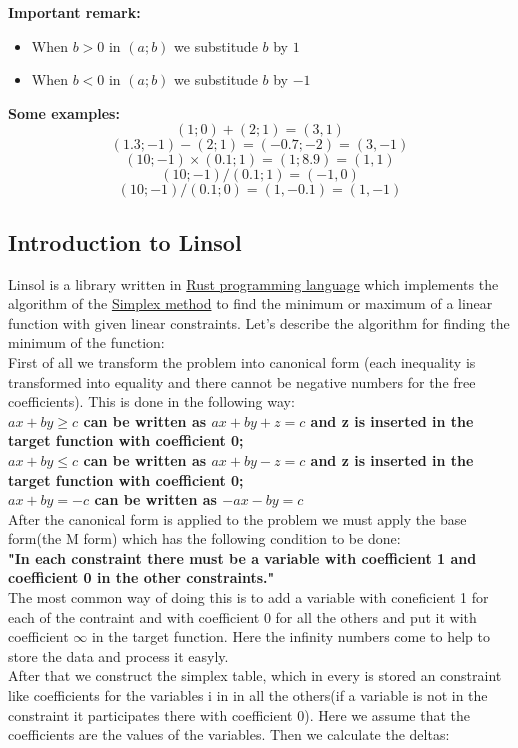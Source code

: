 \documentclass[]{article}
\begin{document}
			\Large{\textbf{Important remark: }}
			\begin{itemize}
				\item When $b>0$ in $(a; b)$ we substitude $b$ by $1$
				\item When $b<0$ in $(a; b)$ we substitude $b$ by $-1$
			\end{itemize}
			\textbf{Some examples:}
			$$(1; 0) + (2; 1) = (3, 1)$$
			$$(1.3; -1) - (2; 1) = (-0.7; -2) = (3, -1)$$
			$$(10; -1) \times (0.1; 1) = (1; 8.9) = (1, 1)$$
			$$(10; -1) / (0.1; 1) = (-1, 0)$$
			$$(10; -1) / (0.1; 0) = (1, -0.1) = (1, -1)$$
		\subsection{Introduction to Linsol}
			Linsol is a library written in  \href{https://www.rust-lang.org/en-US/}{Rust programming language} which implements the algorithm of the \href{https://en.wikipedia.org/wiki/Simplex_algorithm}{Simplex method} to find the minimum or maximum of a linear function with given linear constraints.
			Let's describe the algorithm for finding the minimum of the function:\\
			First of all we transform the problem into canonical form (each inequality is transformed into equality and there cannot be negative numbers for the free coefficients). This is done in the following way:\\
			\textbf{$ ax + by \geq c$ can be written as $ax + by + z = c$ and z is inserted in the target function with coefficient 0;\\
			$ ax + by \leq c$ can be written as $ax + by - z = c$ and z is inserted in the target function with coefficient 0;\\
			$ ax + by = -c$ can be written as $-ax - by = c$}\\
			After the canonical form is applied to the problem we must apply the base form(the M form) which has the following condition to be done:\\
			\textbf{"In each constraint there must be a variable with coefficient 1 and coefficient 0 in the other constraints."}\\
			The most common way of doing this is to add a variable with coneficient 1 for each of the contraint and with coefficient 0 for all the others and put it with coefficient $\infty$ in the target function. Here the infinity numbers come to help to store the data and process it easyly.\\
			After that we construct the simplex table, which in every is stored an constraint like coefficients for the variables i in in all the others(if a variable is not in the constraint it participates there with coefficient 0). Here we assume that the coefficients are the values of the variables. Then we calculate the deltas:
\end{document}
